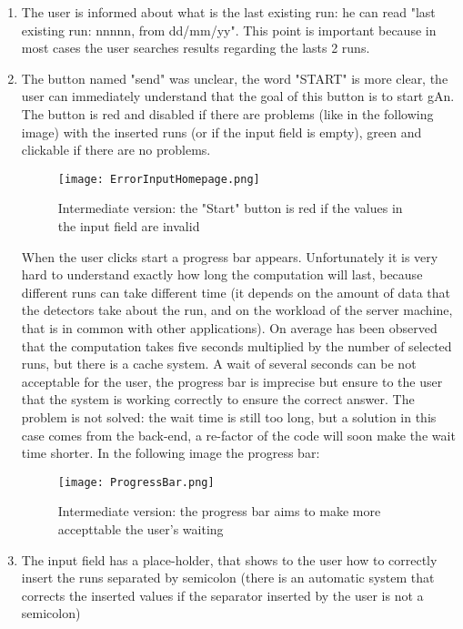 \begin{enumerate}

\item The user is informed about what is the last existing run: he can read "last existing run: nnnnn, from dd/mm/yy". This point is important because in most cases the user searches results regarding the lasts 2 runs.

\item The button named "send" was unclear, the word "START" is more clear, the user can immediately understand that the goal of this button is to start gAn. The button is red and disabled if there are problems (like in the following image) with the inserted runs (or if the input field is empty), green and clickable if there are no problems.	

\begin{figure}[H]
\centering
\texttt{[image: ErrorInputHomepage.png]}  
\caption{Intermediate version: the "Start" button is red if the values in the input field are invalid}
\end{figure}

When the user clicks start a progress bar appears. Unfortunately it is very hard to understand exactly how long the computation will last, because different runs can take different time (it depends on the amount of data that the detectors take about the run, and on the workload of the server machine, that is in common with other applications). On average has been observed that the computation takes five seconds multiplied by the number of selected runs, but there is a cache system. A wait of several seconds can be not acceptable for the user, the progress bar is imprecise but ensure to the user that the system is working correctly to ensure the correct answer. The problem is not solved: the wait time is still too long, but a solution in this case comes from the back-end, a re-factor of the code will soon make the wait time shorter. In the following image the progress bar:

\begin{figure}[H]
\centering
\texttt{[image: ProgressBar.png]}  
\caption{Intermediate version: the progress bar aims to make more accepttable the user's waiting}
\end{figure}



\item The input field has a place-holder, that shows to the user how to correctly insert the runs separated by semicolon (there is an automatic system that corrects the inserted values if the separator inserted by the user is not a semicolon)
 

\end{enumerate}
